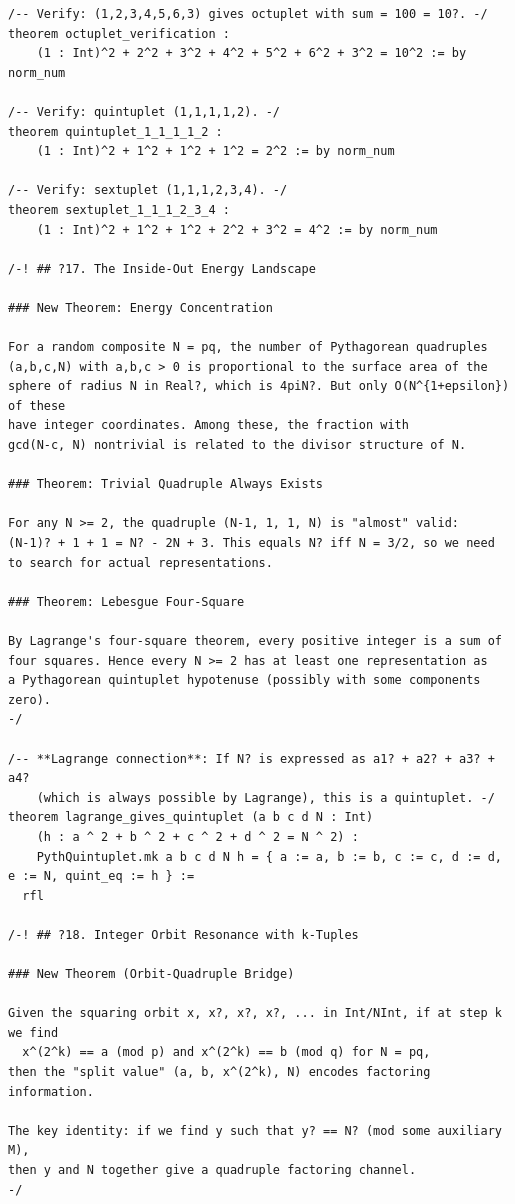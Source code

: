 \documentclass[11pt,twoside,openright]{book}
\theoremstyle{definition}
\theoremstyle{remark}
\begin{document}
\begin{lstlisting}[style=lean]
/-- Verify: (1,2,3,4,5,6,3) gives octuplet with sum = 100 = 10?. -/
theorem octuplet_verification :
    (1 : Int)^2 + 2^2 + 3^2 + 4^2 + 5^2 + 6^2 + 3^2 = 10^2 := by norm_num

/-- Verify: quintuplet (1,1,1,1,2). -/
theorem quintuplet_1_1_1_1_2 :
    (1 : Int)^2 + 1^2 + 1^2 + 1^2 = 2^2 := by norm_num

/-- Verify: sextuplet (1,1,1,2,3,4). -/
theorem sextuplet_1_1_1_2_3_4 :
    (1 : Int)^2 + 1^2 + 1^2 + 2^2 + 3^2 = 4^2 := by norm_num

/-! ## ?17. The Inside-Out Energy Landscape

### New Theorem: Energy Concentration

For a random composite N = pq, the number of Pythagorean quadruples
(a,b,c,N) with a,b,c > 0 is proportional to the surface area of the
sphere of radius N in Real?, which is 4piN?. But only O(N^{1+epsilon}) of these
have integer coordinates. Among these, the fraction with
gcd(N-c, N) nontrivial is related to the divisor structure of N.

### Theorem: Trivial Quadruple Always Exists

For any N >= 2, the quadruple (N-1, 1, 1, N) is "almost" valid:
(N-1)? + 1 + 1 = N? - 2N + 3. This equals N? iff N = 3/2, so we need
to search for actual representations.

### Theorem: Lebesgue Four-Square

By Lagrange's four-square theorem, every positive integer is a sum of
four squares. Hence every N >= 2 has at least one representation as
a Pythagorean quintuplet hypotenuse (possibly with some components zero).
-/

/-- **Lagrange connection**: If N? is expressed as a1? + a2? + a3? + a4?
    (which is always possible by Lagrange), this is a quintuplet. -/
theorem lagrange_gives_quintuplet (a b c d N : Int)
    (h : a ^ 2 + b ^ 2 + c ^ 2 + d ^ 2 = N ^ 2) :
    PythQuintuplet.mk a b c d N h = { a := a, b := b, c := c, d := d, e := N, quint_eq := h } :=
  rfl

/-! ## ?18. Integer Orbit Resonance with k-Tuples

### New Theorem (Orbit-Quadruple Bridge)

Given the squaring orbit x, x?, x?, x?, ... in Int/NInt, if at step k we find
  x^(2^k) == a (mod p) and x^(2^k) == b (mod q) for N = pq,
then the "split value" (a, b, x^(2^k), N) encodes factoring information.

The key identity: if we find y such that y? == N? (mod some auxiliary M),
then y and N together give a quadruple factoring channel.
-/


\end{lstlisting}
\end{document}
